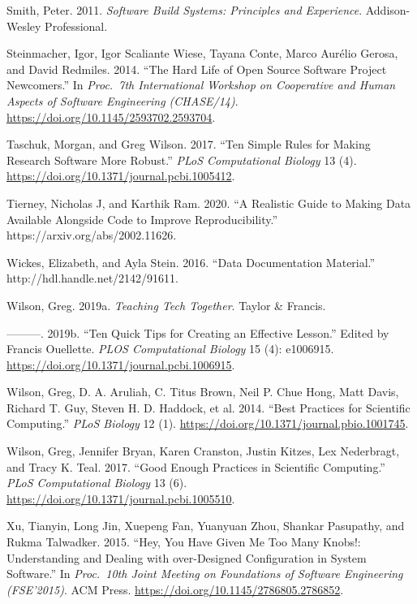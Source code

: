 \documentclass[
]{krantz}
\newlength{\cslhangindent}
\newenvironment{cslreferences}%
  {\setlength{\parindent}{0pt}%
  \everypar{\setlength{\hangindent}{\cslhangindent}}\ignorespaces}%
  {\par}
\begin{document}
\begin{cslreferences}
\leavevmode\hypertarget{ref-Smit2011}{}%
Smith, Peter. 2011. \emph{Software Build Systems: Principles and Experience}. Addison-Wesley Professional.

\leavevmode\hypertarget{ref-Stei2014}{}%
Steinmacher, Igor, Igor Scaliante Wiese, Tayana Conte, Marco Aurélio Gerosa, and David Redmiles. 2014. ``The Hard Life of Open Source Software Project Newcomers.'' In \emph{Proc.~7th International Workshop on Cooperative and Human Aspects of Software Engineering (CHASE/14)}. \url{https://doi.org/10.1145/2593702.2593704}.

\leavevmode\hypertarget{ref-Tasc2017}{}%
Taschuk, Morgan, and Greg Wilson. 2017. ``Ten Simple Rules for Making Research Software More Robust.'' \emph{PLoS Computational Biology} 13 (4). \url{https://doi.org/10.1371/journal.pcbi.1005412}.

\leavevmode\hypertarget{ref-Tier2020}{}%
Tierney, Nicholas J, and Karthik Ram. 2020. ``A Realistic Guide to Making Data Available Alongside Code to Improve Reproducibility.'' https://arxiv.org/abs/2002.11626.

\leavevmode\hypertarget{ref-Wick2016}{}%
Wickes, Elizabeth, and Ayla Stein. 2016. ``Data Documentation Material.'' http://hdl.handle.net/2142/91611.

\leavevmode\hypertarget{ref-Wils2018}{}%
Wilson, Greg. 2019a. \emph{Teaching Tech Together}. Taylor \& Francis.

\leavevmode\hypertarget{ref-Wils2019}{}%
---------. 2019b. ``Ten Quick Tips for Creating an Effective Lesson.'' Edited by Francis Ouellette. \emph{PLOS Computational Biology} 15 (4): e1006915. \url{https://doi.org/10.1371/journal.pcbi.1006915}.

\leavevmode\hypertarget{ref-Wils2014}{}%
Wilson, Greg, D. A. Aruliah, C. Titus Brown, Neil P. Chue Hong, Matt Davis, Richard T. Guy, Steven H. D. Haddock, et al. 2014. ``Best Practices for Scientific Computing.'' \emph{PLoS Biology} 12 (1). \url{https://doi.org/10.1371/journal.pbio.1001745}.

\leavevmode\hypertarget{ref-Wils2017}{}%
Wilson, Greg, Jennifer Bryan, Karen Cranston, Justin Kitzes, Lex Nederbragt, and Tracy K. Teal. 2017. ``Good Enough Practices in Scientific Computing.'' \emph{PLoS Computational Biology} 13 (6). \url{https://doi.org/10.1371/journal.pcbi.1005510}.

\leavevmode\hypertarget{ref-Xu2015}{}%
Xu, Tianyin, Long Jin, Xuepeng Fan, Yuanyuan Zhou, Shankar Pasupathy, and Rukma Talwadker. 2015. ``Hey, You Have Given Me Too Many Knobs!: Understanding and Dealing with over-Designed Configuration in System Software.'' In \emph{Proc.~10th Joint Meeting on Foundations of Software Engineering (FSE'2015)}. ACM Press. \url{https://doi.org/10.1145/2786805.2786852}.


\end{cslreferences}
\end{document}
